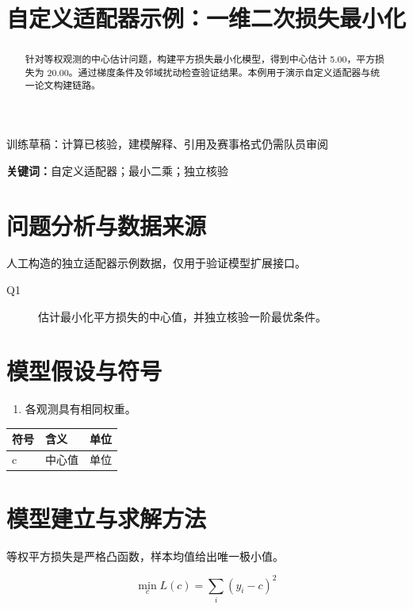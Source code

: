\documentclass[UTF8,a4paper,11pt,fontset=fandol]{ctexart}
\title{\bfseries 自定义适配器示例：一维二次损失最小化}
\author{}
\date{}
\begin{document}
\maketitle
\vspace{-2.4em}
\begin{center}\small\color{accent}训练草稿：计算已核验，建模解释、引用及赛事格式仍需队员审阅\end{center}
\begin{abstract}
针对等权观测的中心估计问题，构建平方损失最小化模型，得到中心估计 5.00，平方损失为 20.00。通过梯度条件及邻域扰动检查验证结果。本例用于演示自定义适配器与统一论文构建链路。
\end{abstract}
\noindent\textbf{关键词：}自定义适配器；最小二乘；独立核验

\section{问题分析与数据来源}
人工构造的独立适配器示例数据，仅用于验证模型扩展接口。
\begin{description}

\item[Q1] 估计最小化平方损失的中心值，并独立核验一阶最优条件。

\end{description}

\section{模型假设与符号}
\begin{enumerate}

\item 各观测具有相同权重。

\end{enumerate}
\begin{longtable}{p{}p{}p{}}
\toprule 符号 & 含义 & 单位 \\ \midrule

c & 中心值 & 单位 \\

\bottomrule
\end{longtable}

\section{模型建立与求解方法}
等权平方损失是严格凸函数，样本均值给出唯一极小值。

\begin{equation}
\min_c L(c)=\sum_i(y_i-c)^2
\end{equation}
\end{document}
